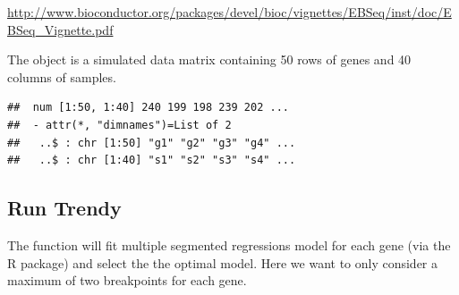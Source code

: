 \documentclass{article}
\begin{document}
\small{\url{http://www.bioconductor.org/packages/devel/bioc/vignettes/EBSeq/inst/doc/EBSeq_Vignette.pdf}}


The object  is a simulated data matrix containing 
50 rows of genes and 40 columns of samples.

\begin{knitrout}
\color{fgcolor}\begin{kframe}
\begin{alltt}
\hlstd{(}\hlstd{)}
\end{alltt}
\begin{verbatim}
##  num [1:50, 1:40] 240 199 198 239 202 ...
##  - attr(*, "dimnames")=List of 2
##   ..$ : chr [1:50] "g1" "g2" "g3" "g4" ...
##   ..$ : chr [1:40] "s1" "s2" "s3" "s4" ...
\end{verbatim}
\end{kframe}
\end{knitrout}




\subsection{Run Trendy}

The  function will fit multiple segmented regressions model 
for each gene (via the  R package) and select the the 
optimal model. Here we want to only consider a maximum of two breakpoints for 
each gene.
\end{document}
